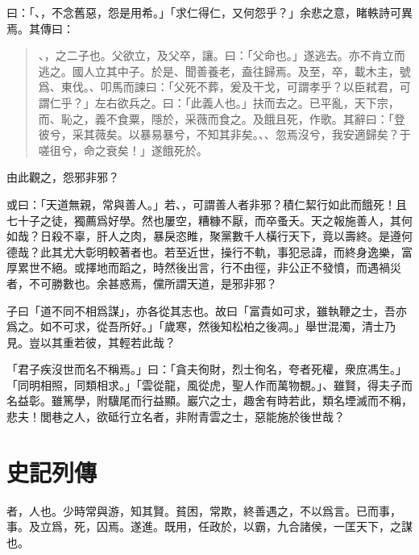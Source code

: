 曰：「、，不念舊惡，怨是用希。」「求仁得仁，又何怨乎？」余悲之意，睹軼詩可異焉。其傳曰：
\begin{quotation}
、，之二子也。父欲立，及父卒，讓。曰：「父命也。」遂逃去。亦不肯立而逃之。國人立其中子。於是、聞善養老，盍往歸焉。及至，卒，載木主，號爲、東伐。、叩馬而諫曰：「父死不葬，爰及干戈，可謂孝乎？以臣弒君，可謂仁乎？」左右欲兵之。曰：「此義人也。」扶而去之。已平亂，天下宗，而、恥之，義不食粟，隱於，采薇而食之。及餓且死，作歌。其辭曰：「登彼兮，采其薇矣。以暴易暴兮，不知其非矣。、、忽焉沒兮，我安適歸矣？于嗟徂兮，命之衰矣！」遂餓死於。
\end{quotation}
由此觀之，怨邪非邪？

或曰：「天道無親，常與善人。」若、，可謂善人者非邪？積仁絜行如此而餓死！且七十子之徒，獨薦爲好學。然也屢空，糟糠不厭，而卒蚤夭。天之報施善人，其何如哉？日殺不辜，肝人之肉，暴戾恣睢，聚黨數千人橫行天下，竟以壽終。是遵何德哉？此其尤大彰明較著者也。若至近世，操行不軌，事犯忌諱，而終身逸樂，富厚累世不絕。或擇地而蹈之，時然後出言，行不由徑，非公正不發憤，而遇禍災者，不可勝數也。余甚惑焉，儻所謂天道，是邪非邪？

子曰「道不同不相爲謀」，亦各從其志也。故曰「富貴如可求，雖執鞭之士，吾亦爲之。如不可求，從吾所好。」「歲寒，然後知松柏之後凋。」舉世混濁，清士乃見。豈以其重若彼，其輕若此哉？

「君子疾沒世而名不稱焉。」曰：「貪夫徇財，烈士徇名，夸者死權，衆庶馮生。」「同明相照，同類相求。」「雲從龍，風從虎，聖人作而萬物覩。」、雖賢，得夫子而名益彰。雖篤學，附驥尾而行益顯。巖穴之士，趣舍有時若此，類名堙滅而不稱，悲夫！閭巷之人，欲砥行立名者，非附青雲之士，惡能施於後世哉？

\section[管晏列傳\quad{\small 史記}]{{\normalsize 史記}\quad{}列傳}
者，人也。少時常與游，知其賢。貧困，常欺，終善遇之，不以爲言。已而事，事。及立爲，死，囚焉。遂進。既用，任政於，以霸，九合諸侯，一匡天下，之謀也。

